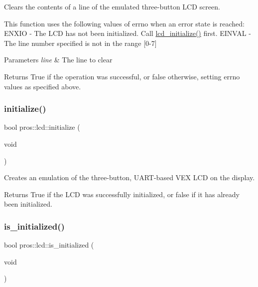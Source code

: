 Clears the contents of a line of the emulated three-\/button L\+CD screen. 

This function uses the following values of errno when an error state is reached\+: E\+N\+X\+IO -\/ The L\+CD has not been initialized. Call \hyperlink{llemu_8h_ae618494f080e95b506c0c18cb1ffb407}{lcd\+\_\+initialize()} first. E\+I\+N\+V\+AL -\/ The line number specified is not in the range \mbox{[}0-\/7\mbox{]}


\begin{DoxyParams}{Parameters}
{\em line} & The line to clear\\
\hline
\end{DoxyParams}
\begin{DoxyReturn}{Returns}
True if the operation was successful, or false otherwise, setting errno values as specified above. 
\end{DoxyReturn}
\mbox{\label{namespacepros_1_1lcd_afb69bfa2fc5da3018b6886f612ed190e}} 
\subsubsection{\texorpdfstring{initialize()}{initialize()}}
{\footnotesize\ttfamily bool pros\+::lcd\+::initialize (\begin{DoxyParamCaption}\item[{void}]{ }\end{DoxyParamCaption})}



Creates an emulation of the three-\/button, U\+A\+R\+T-\/based V\+EX L\+CD on the display. 

\begin{DoxyReturn}{Returns}
True if the L\+CD was successfully initialized, or false if it has already been initialized. 
\end{DoxyReturn}
\mbox{\label{namespacepros_1_1lcd_a867eb9cd989e1c6c31982fe2b5c58dd9}} 
\subsubsection{\texorpdfstring{is\+\_\+initialized()}{is\_initialized()}}
{\footnotesize\ttfamily bool pros\+::lcd\+::is\+\_\+initialized (\begin{DoxyParamCaption}\item[{void}]{ }\end{DoxyParamCaption})}



